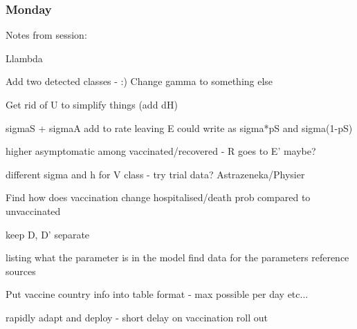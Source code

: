 \documentclass[a4paper,11pt]{article}
\theoremstyle{plain}
\theoremstyle{definition}
\begin{document}
\subsubsection{Monday}

Notes from session:

Llambda

Add two detected classes - :)
Change gamma to something else 

Get rid of U to simplify things (add dH)

sigmaS + sigmaA add to rate leaving E
could write as sigma*pS and sigma(1-pS)

higher asymptomatic among vaccinated/recovered - R goes to E' maybe?

different sigma and h for V class - try trial data? Astrazeneka/Physier

Find how does vaccination change hospitalised/death prob compared to unvaccinated

keep D, D' separate

listing what the parameter is in the model find data for the parameters reference sources

Put vaccine country info into table format - max possible per day etc...

rapidly adapt and deploy - short delay on vaccination roll out
\end{document}
